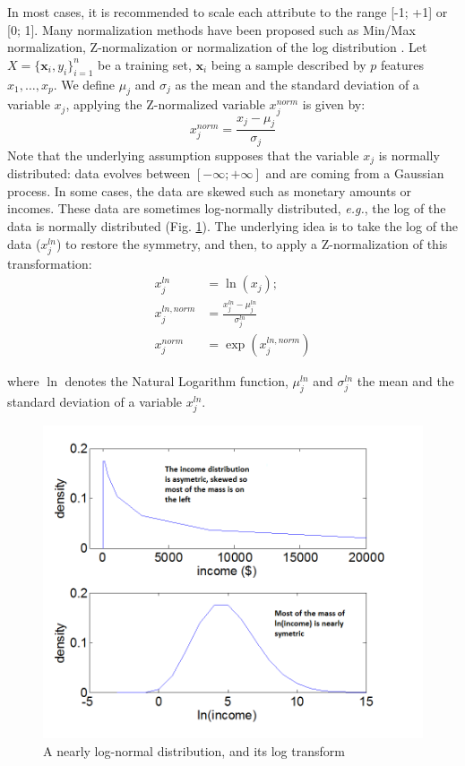 In most cases, it is recommended to scale each attribute to the range [-1; +1] or [0; 1]. Many normalization methods have been proposed such as Min/Max normalization, Z-normalization or normalization of the log distribution . Let $X=\{\textbf{x}_i,y_i\}_{i=1}^n$ be a training set, $\textbf{x}_i$ being a sample described by $p$ features $x_1, \ldots, x_p$. We define $\mu_j$ and $\sigma_j$ as the mean and the standard deviation of a variable $x_j$, applying the Z-normalized variable $x^{norm}_j$ is given by:
\begin{equation}
x^{norm}_j = \frac{x_j-\mu_j}{\sigma_j}
\end{equation}
Note that the underlying assumption supposes that the variable $x_j$ is normally distributed: data evolves between $[-\infty;+\infty]$ and are coming from a Gaussian process. In some cases, the data are skewed such as monetary amounts or incomes. These data are sometimes log-normally distributed, \textit{e.g.}, the log of the data is normally distributed (Fig. \ref{fig:SkewedData}). The underlying idea is to take the log of the data ($x^{ln}_j$) to restore the symmetry, and then, to apply a Z-normalization of this transformation:
\begin{align}
x^{ln}_j 		& = \ln(x_j); \\
x^{ln,norm}_j & = \frac{x^{ln}_j-\mu^{ln}_j}{\sigma^{ln}_j} \\
x^{norm}_j 	& = \exp(x^{ln,norm}_j)
\end{align}

\noindent where $\ln$ denotes the Natural Logarithm function, $\mu^{ln}_j$ and $\sigma^{ln}_j$ the mean and the standard deviation of a variable $x^{ln}_j$.

\begin{figure}
	\centering
	\includegraphics[width=0.6\linewidth]{images/SkewedData2}
	\caption{A nearly log-normal distribution, and its log transform \protect\footnotemark}
	\label{fig:SkewedData}
\end{figure}


